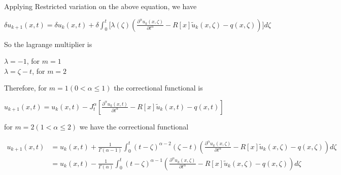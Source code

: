 \documentclass[12pt, a4paper]{report}
\begin{document}
Applying Restricted variation on the above equation, we have
\begin{center}
    $\delta u_{k+1}(x, t) = \delta u_k(x, t) + \delta \int_0^t\Biggl[\lambda(\zeta) \left(\frac{\partial^\alpha u_k(x, \zeta)}{\partial t^\alpha} - R[x] \tilde{u}_k(x, \zeta) - q(x, \zeta)\right)\Biggr] d\zeta$
\end{center}


So the lagrange multiplier is
\begin{center}
    $\lambda = -1$, for $m = 1$ \\
    $\lambda = \zeta - t$, for $m = 2$
\end{center}
Therefore, for $m=1(0< \alpha \leq 1)$ the correctional functional is
\begin{center}
$u_{k+1}(x, t) = u_k(x, t) - J_t^\alpha\left[\frac{\partial^\alpha u_k(x, t)}{\partial t^\alpha} - R[x] \tilde{u}_k(x, t) - q(x, t)\right]$
\end{center}
for $m=2(1< \alpha \leq 2)$ we have the correctional functional
\begin{center}
$\begin{aligned}
u_{k+1}(x, t) & = u_k(x, t) + \frac{1}{\Gamma(\alpha-1)} \int_0^t(t-\zeta)^{\alpha-2}(\zeta-t)\left(\frac{\partial^\alpha u_k(x, \zeta)}{\partial t^\alpha} - R[x] \tilde{u}_k(x, \zeta) - q(x, \zeta)\right)d\zeta \\
& = u_k(x, t) - \frac{1}{\Gamma(\alpha)} \int_0^t(t-\zeta)^{\alpha-1}\left(\frac{\partial^\alpha u_k(x, \zeta)}{\partial t^\alpha} - R[x] \tilde{u}_k(x, \zeta) - q(x, \zeta)\right) d \zeta
\end{aligned}$
\end{center}
\end{document}
